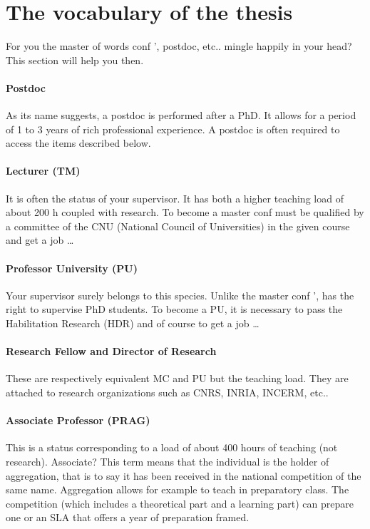 \section{The vocabulary of the thesis}
For you the master of words conf ', postdoc, etc.. mingle happily in your head?
This section will help you then.
\paragraph {Postdoc}
As its name suggests, a postdoc is performed after a PhD.
It allows for a period of 1 to 3 years of rich professional experience.
A postdoc is often required to access the items described below.
\paragraph {Lecturer (TM)}
It is often the status of your supervisor.
It has both a higher teaching load of about 200 h coupled with research.
To become a master conf must be qualified by a committee of the CNU (National Council of Universities) in the given course and get a job \dots
\paragraph{Professor University (PU)}
Your supervisor surely belongs to this species.
Unlike the master conf ', has the right to supervise PhD students.
To become a PU, it is necessary to pass the Habilitation Research (HDR) and of course to get a job \dots
\paragraph{Research Fellow and Director of Research}
These are respectively equivalent MC and PU but the teaching load.
They are attached to research organizations such as CNRS, INRIA, INCERM, etc..
\paragraph{Associate Professor (PRAG)} This is a status corresponding to a load of about 400 hours of teaching (not research).
Associate? This term means that the individual is the holder of aggregation, that is to say it has been received in the national competition of the same name.
Aggregation allows for example to teach in preparatory class.
The competition (which includes a theoretical part and a learning part) can prepare one or an SLA that offers a year of preparation framed.

